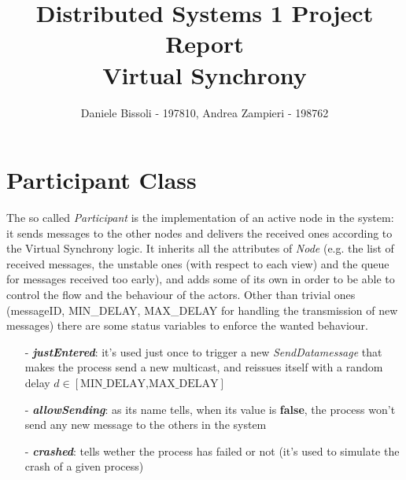 \documentclass[11pt]{article}
\title{\LARGE{\textbf{Distributed Systems 1 Project Report\\\small{Virtual Synchrony}}}}
\author{Daniele Bissoli - 197810, Andrea Zampieri - 198762}
\date{}
\begin{document}
	\maketitle
	
	\section{Participant Class}
		The so called \textit{Participant} is the implementation of an active node in the system: it sends messages to the other nodes and delivers the received ones according to the Virtual Synchrony logic.\newline
		It inherits all the attributes of \textit{Node} (e.g. the list of received messages, the unstable ones (with respect to each view) and the queue for messages received too early), and adds some of its own in order to be able to control the flow and the behaviour of the actors. Other than trivial ones (messageID, MIN\_DELAY, MAX\_DELAY for handling the transmission of new messages) there are some status variables to enforce the wanted behaviour. 
		\begin{itemize}
			\item [-] \textit{\textbf{justEntered}}: it's used just once to trigger a new \textit{SendDatamessage} that makes the process send a new multicast, and reissues itself with a random delay $d \in [\text{MIN\_DELAY,MAX\_DELAY}]$
			\item [-] \textit{\textbf{allowSending}}: as its name tells, when its value is \textbf{false}, the process won't send any new message to the others in the system
			\item [-] \textit{\textbf{crashed}}: tells wether the process has failed or not (it's used to simulate the crash of a given process)
		\end{itemize}
		
\end{document}
